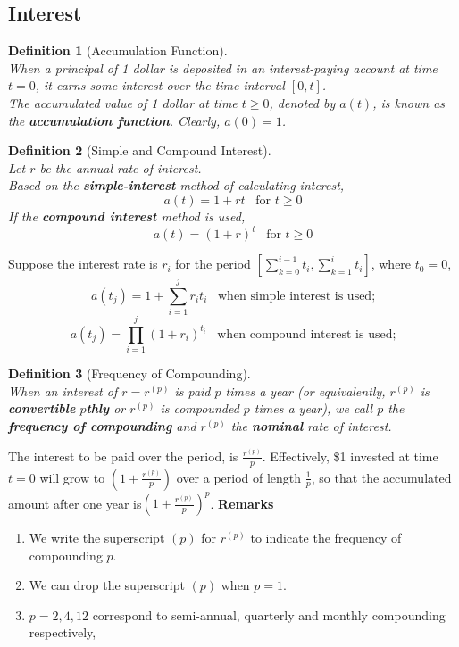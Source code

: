 \documentclass[12pt]{article}
\newtheorem{definition}{Definition}[section]
\theoremstyle{definition}
\begin{document}
\subsection{Interest}
\begin{definition}[Accumulation Function]
\hfill\\\normalfont When a principal of 1 dollar is deposited in an interest-paying account at time $t=0$, it earns some interest over the time interval $[0,t]$. \\
The accumulated value of 1 dollar at time $t \geq 0$, denoted by $a(t)$, is known as the \textbf{accumulation function}. Clearly, $a(0)=1$.
\end{definition}
\begin{definition}[Simple and Compound Interest]
\hfill\\\normalfont Let $r$ be the annual rate of interest.\\
Based on the \textbf{simple-interest} method of calculating interest,
\[
a(t)=1+rt\;\;\;\text{for }t \geq 0
\]
If the \textbf{compound interest} method is used,
\[
a(t)=(1+r)^t \;\;\;\text{for }t\geq 0
\]
\end{definition}
Suppose the interest rate is $r_i$ for the period $[\sum_{k=0}^{i-1} t_i,\sum_{k=1}^{i} t_{i} ]$, where $t_0 = 0$, 
\[
a(t_j)=1+\sum_{i=1}^j r_it_i \;\;\;\text{when simple interest is used;}
\]
\[
a(t_j)=\prod_{i=1}^j (1+r_i)^{t_i}\;\;\;\text{when compound interest is used;}
\]
\begin{definition}[Frequency of Compounding]
\hfill\\\normalfont When an interest of $r = r^{(p)}$ is paid $p$ times a year (or equivalently, $r^{(p)}$ is \textbf{convertible} $p$\textbf{thly} or $r^{(p)}$ is compounded $p$ times a year), we call $p$ the \textbf{frequency of compounding} and $r^{(p)}$ the \textbf{nominal} rate of interest.
\end{definition}
The interest to be paid over the period, is $\frac{r^{(p)}}{p}$. Effectively, \$1 invested at time $t=0$ will grow to $\left(1+\frac{r^{(p)}}{p}\right)$ over a period of length $\frac{1}{p}$, so that the accumulated amount after one year is$\left(1+\frac{r^{(p)}}{p}\right)^p$.
\textbf{Remarks}
\begin{enumerate}
  \item We write the superscript $(p)$ for $r^{(p)}$ to indicate the frequency of compounding $p$.
  \item We can drop the superscript $(p)$ when $p=1$.
  \item $p = 2, 4, 12 $ correspond to semi-annual, quarterly and monthly compounding respectively,
\end{enumerate}
\end{document}
